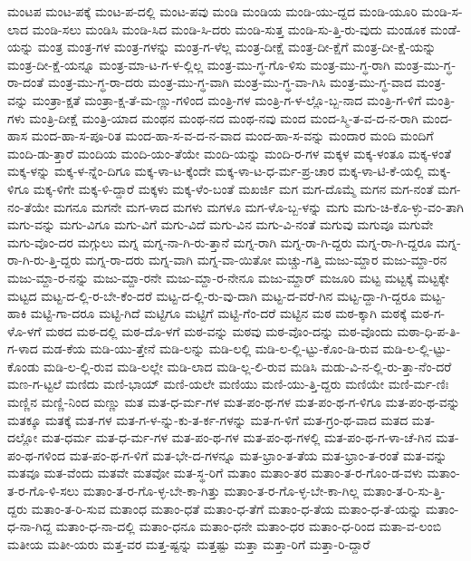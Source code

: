 {ಮಂಟಪ
ಮಂಟ-ಪಕ್ಕೆ
ಮಂಟ-ಪ-ದಲ್ಲಿ
ಮಂಟ-ಪವು
ಮಂಡಿ
ಮಂಡಿಯ
ಮಂಡಿ-ಯು-ದ್ದದ
ಮಂಡಿ-ಯೂರಿ
ಮಂಡಿ-ಸ-ಲಾದ
ಮಂಡಿ-ಸಲು
ಮಂಡಿಸಿ
ಮಂಡಿ-ಸಿದ
ಮಂಡಿ-ಸಿ-ದರು
ಮಂಡಿ-ಸುತ್ತ
ಮಂಡಿ-ಸು-ತ್ತಿ-ರು-ವುದು
ಮಂಡೂಕ
ಮಂಡೆ-ಯನ್ನು
ಮಂತ್ರ
ಮಂತ್ರ-ಗಳ
ಮಂತ್ರ-ಗಳನ್ನು
ಮಂತ್ರ-ಗ-ಳೆಲ್ಲ
ಮಂತ್ರ-ದೀಕ್ಷೆ
ಮಂತ್ರ-ದೀ-ಕ್ಷೆಗೆ
ಮಂತ್ರ-ದೀ-ಕ್ಷೆ-ಯನ್ನು
ಮಂತ್ರ-ದೀ-ಕ್ಷೆ-ಯನ್ನೂ
ಮಂತ್ರ-ಮಾ-ಟ-ಗ-ಳ-ಲ್ಲಿಲ್ಲ
ಮಂತ್ರ-ಮು-ಗ್ಧ-ಗೊ-ಳಿಸು
ಮಂತ್ರ-ಮು-ಗ್ಧ-ರಾಗಿ
ಮಂತ್ರ-ಮು-ಗ್ಧ-ರಾ-ದಂತೆ
ಮಂತ್ರ-ಮು-ಗ್ಧ-ರಾ-ದರು
ಮಂತ್ರ-ಮು-ಗ್ಧ-ವಾಗಿ
ಮಂತ್ರ-ಮು-ಗ್ಧ-ವಾ-ಗಿಸಿ
ಮಂತ್ರ-ಮು-ಗ್ಧ-ವಾದ
ಮಂತ್ರ-ವನ್ನು
ಮಂತ್ರಾ-ಕ್ಷತೆ
ಮಂತ್ರಾ-ಕ್ಷ-ತೆ-ಮ-ಣ್ಣು-ಗಳಿಂದ
ಮಂತ್ರಿ-ಗಳ
ಮಂತ್ರಿ-ಗ-ಳ-ಲ್ಲೊ-ಬ್ಬ-ನಾದ
ಮಂತ್ರಿ-ಗ-ಳಿಗೆ
ಮಂತ್ರಿ-ಗಳು
ಮಂತ್ರಿ-ದೀಕ್ಷೆ
ಮಂತ್ರಿ-ಯಾದ
ಮಂಥನ
ಮಂಥ-ನದ
ಮಂಥ-ನವು
ಮಂದ
ಮಂದ-ಸ್ಮಿ-ತ-ವ-ದ-ನ-ರಾಗಿ
ಮಂದ-ಹಾಸ
ಮಂದ-ಹಾ-ಸ-ಪೂ-ರಿತ
ಮಂದ-ಹಾ-ಸ-ವ-ದ-ನ-ವಾದ
ಮಂದ-ಹಾ-ಸ-ವನ್ನು
ಮಂದಾರ
ಮಂದಿ
ಮಂದಿಗೆ
ಮಂದಿ-ಡು-ತ್ತಾರೆ
ಮಂದಿಯ
ಮಂದಿ-ಯಂ-ತೆಯೇ
ಮಂದಿ-ಯನ್ನು
ಮಂದಿ-ರ-ಗಳ
ಮಕ್ಕಳ
ಮಕ್ಕ-ಳಂತೂ
ಮಕ್ಕ-ಳಂತೆ
ಮಕ್ಕ-ಳನ್ನು
ಮಕ್ಕ-ಳ-ನ್ನೆಂ-ದಿಗೂ
ಮಕ್ಕ-ಳಾ-ಟ-ಕ್ಕೆಂದೇ
ಮಕ್ಕ-ಳಾ-ಟ-ಧ-ರ್ಮ-ಪ್ರ-ಚಾರ
ಮಕ್ಕ-ಳಾ-ಟಿ-ಕೆ-ಯಲ್ಲಿ
ಮಕ್ಕ-ಳಿಗೂ
ಮಕ್ಕ-ಳಿಗೇ
ಮಕ್ಕ-ಳಿ-ದ್ದಾರೆ
ಮಕ್ಕಳು
ಮಕ್ಕ-ಳೆಂ-ಬಂತೆ
ಮಖರ್ಜಿ
ಮಗ
ಮಗ-ದೊಮ್ಮೆ
ಮಗನ
ಮಗ-ನಂತೆ
ಮಗ-ನಂ-ತೆಯೇ
ಮಗನೂ
ಮಗನೇ
ಮಗ-ಳಾದ
ಮಗಳು
ಮಗಳೂ
ಮಗ-ಳೊ-ಬ್ಬ-ಳನ್ನು
ಮಗು
ಮಗು-ಚಿ-ಕೊ-ಳ್ಳು-ವಂ-ತಾಗಿ
ಮಗು-ವನ್ನು
ಮಗು-ವಿಗೂ
ಮಗು-ವಿಗೆ
ಮಗು-ವಿದೆ
ಮಗು-ವಿನ
ಮಗು-ವಿ-ನಂತೆ
ಮಗುವು
ಮಗುವೂ
ಮಗುವೇ
ಮಗು-ವೊಂ-ದರ
ಮಗ್ಗುಲು
ಮಗ್ನ
ಮಗ್ನ-ನಾ-ಗಿ-ರು-ತ್ತಾನೆ
ಮಗ್ನ-ರಾಗಿ
ಮಗ್ನ-ರಾ-ಗಿ-ದ್ದರು
ಮಗ್ನ-ರಾ-ಗಿ-ದ್ದರೂ
ಮಗ್ನ-ರಾ-ಗಿ-ರು-ತ್ತಿ-ದ್ದರು
ಮಗ್ನ-ರಾ-ದರು
ಮಗ್ನ-ವಾಗಿ
ಮಗ್ನ-ವಾ-ಯಿತೋ
ಮಚ್ಚು-ಗತ್ತಿ
ಮಜು-ಮ್ದಾರ
ಮಜು-ಮ್ದಾ-ರನ
ಮಜು-ಮ್ದಾ-ರ-ನನ್ನು
ಮಜು-ಮ್ದಾ-ರನೇ
ಮಜು-ಮ್ದಾ-ರ-ನೇನೂ
ಮಜು-ಮ್ದಾರ್
ಮಜೂರಿ
ಮಟ್ಟ
ಮಟ್ಟಕ್ಕೆ
ಮಟ್ಟಕ್ಕೇ
ಮಟ್ಟದ
ಮಟ್ಟ-ದ-ಲ್ಲಿ-ರ-ಬೇ-ಕೆಂ-ದರೆ
ಮಟ್ಟ-ದ-ಲ್ಲಿ-ರು-ವು-ದಾಗಿ
ಮಟ್ಟ-ದ-ವರೆ-ಗಿನ
ಮಟ್ಟ-ದ್ದಾ-ಗಿ-ದ್ದರೂ
ಮಟ್ಟ-ಹಾಕಿ
ಮಟ್ಟಿ-ಗಾ-ದರೂ
ಮಟ್ಟಿ-ಗಿದೆ
ಮಟ್ಟಿಗೂ
ಮಟ್ಟಿಗೆ
ಮಟ್ಟಿ-ಗೆಂ-ದರೆ
ಮಟ್ಟಿನ
ಮಠ
ಮಠ-ಕ್ಕಾಗಿ
ಮಠಕ್ಕೆ
ಮಠ-ಗ-ಳೊ-ಳಗೆ
ಮಠದ
ಮಠ-ದಲ್ಲಿ
ಮಠ-ದೊ-ಳಗೆ
ಮಠ-ವನ್ನು
ಮಠವು
ಮಠ-ವೊಂ-ದನ್ನು
ಮಠ-ವೊಂದು
ಮಠಾ-ಧಿ-ಪ-ತಿ-ಗ-ಳಾದ
ಮಡ-ಕೆಯ
ಮಡಿ-ಯು-ತ್ತೇನೆ
ಮಡಿ-ಲನ್ನು
ಮಡಿ-ಲಲ್ಲಿ
ಮಡಿ-ಲ-ಲ್ಲಿ-ಟ್ಟು-ಕೊಂ-ಡಿ-ರುವ
ಮಡಿ-ಲ-ಲ್ಲಿ-ಟ್ಟು-ಕೊಂಡು
ಮಡಿ-ಲ-ಲ್ಲಿ-ರುವ
ಮಡಿ-ಲಲ್ಲೇ
ಮಡಿ-ಲಾದ
ಮಡಿ-ಲ್ಲ-ಲಿ-ರುವ
ಮಡಿಸಿ
ಮಡು-ವಿ-ನ-ಲ್ಲಿ-ರು-ತ್ತಾ-ನೆಂ-ದರೆ
ಮಣ-ಗ-ಟ್ಟಲೆ
ಮಣಿದು
ಮಣಿ-ಭಾಯ್
ಮಣಿ-ಯಲೇ
ಮಣಿಯು
ಮಣಿ-ಯು-ತ್ತಿ-ದ್ದರು
ಮಣಿಯೇ
ಮಣಿ-ರ್ಮ-ಣಿಃ
ಮಣ್ಣಿನ
ಮಣ್ಣಿ-ನಿಂದ
ಮಣ್ಣು
ಮತ
ಮತ-ಧ-ರ್ಮ-ಗಳ
ಮತ-ಪಂ-ಥ-ಗಳ
ಮತ-ಪಂ-ಥ-ಗ-ಳಿಗೂ
ಮತ-ಪಂ-ಥ-ವನ್ನು
ಮತಕ್ಕೂ
ಮತಕ್ಕೆ
ಮತ-ಗಳ
ಮತ-ಗ-ಳ-ನ್ನು-ಕು-ತ-ರ್ಕ-ಗಳನ್ನು
ಮತ-ಗ-ಳಿಗೆ
ಮತ-ಗ್ರಂ-ಥ-ವಾದ
ಮತದ
ಮತ-ದಲ್ಲೋ
ಮತ-ಧರ್ಮ
ಮತ-ಧ-ರ್ಮ-ಗಳ
ಮತ-ಪಂ-ಥ-ಗಳ
ಮತ-ಪಂ-ಥ-ಗಳಲ್ಲಿ
ಮತ-ಪಂ-ಥ-ಗ-ಳಾ-ಚೆ-ಗಿನ
ಮತ-ಪಂ-ಥ-ಗಳಿಂದ
ಮತ-ಪಂ-ಥ-ಗ-ಳಿಗೆ
ಮತ-ಭೇ-ದ-ಗಳನ್ನೂ
ಮತ-ಭ್ರಾಂ-ತ-ತೆಯ
ಮತ-ಭ್ರಾಂ-ತ-ರಂತೆ
ಮತ-ವನ್ನು
ಮತವೂ
ಮತ-ವೆಂದು
ಮತವೇ
ಮತವೋ
ಮತ-ಸ್ಥ-ರಿಗೆ
ಮತಾಂ
ಮತಾಂ-ತರ
ಮತಾಂ-ತ-ರ-ಗೊಂ-ಡ-ವಳು
ಮತಾಂ-ತ-ರ-ಗೊ-ಳಿ-ಸಲು
ಮತಾಂ-ತ-ರ-ಗೊ-ಳ್ಳ-ಬೇ-ಕಾ-ಗಿತ್ತು
ಮತಾಂ-ತ-ರ-ಗೊ-ಳ್ಳ-ಬೇ-ಕಾ-ಗಿಲ್ಲ
ಮತಾಂ-ತ-ರಿ-ಸು-ತ್ತಿ-ದ್ದರು
ಮತಾಂ-ತ-ರಿ-ಸುವ
ಮತಾಂಧ
ಮತಾಂ-ಧತೆ
ಮತಾಂ-ಧ-ತೆಗೆ
ಮತಾಂ-ಧ-ತೆಯ
ಮತಾಂ-ಧ-ತೆ-ಯನ್ನು
ಮತಾಂ-ಧ-ನಾ-ಗಿದ್ದ
ಮತಾಂ-ಧ-ನಾ-ದಲ್ಲಿ
ಮತಾಂ-ಧನೂ
ಮತಾಂ-ಧನೇ
ಮತಾಂ-ಧರ
ಮತಾಂ-ಧ-ರಿಂದ
ಮತಾ-ವ-ಲಂಬಿ
ಮತೀಯ
ಮತೀ-ಯರು
ಮತ್ತ-ವರ
ಮತ್ತ-ಷ್ಟನ್ನು
ಮತ್ತಷ್ಟು
ಮತ್ತಾ
ಮತ್ತಾ-ರಿಗೆ
ಮತ್ತಾ-ರಿ-ದ್ದಾರೆ
}

